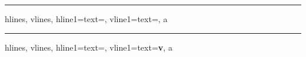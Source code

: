 \documentclass{article}
\begin{document}
\START
\hrule\bigskip

  \begin{tblr}{
    hlines,
    vlines,
    hline{1}={text={}},
    vline{1}={text={}},
  }
    a
  \end{tblr}
\ENDTEST

\bigskip\hrule\bigskip

  \begin{tblr}{
    hlines,
    vlines,
    hline{1}={text={\def\x{}}},
    vline{1}={text={\textbf{v}}},
  }
    a
  \end{tblr}
\ENDTEST
\end{document}
